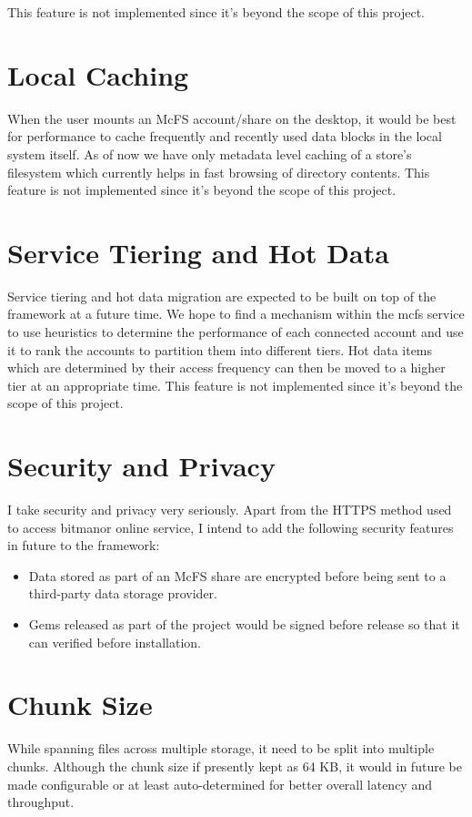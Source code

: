 This feature is not implemented since it's beyond the scope of this project.

\section{Local Caching}
When the user mounts an McFS account/share on the desktop, it would be best for performance to cache frequently and recently used data blocks in the local system itself. As of now we have only metadata level caching of a store's filesystem which currently helps in fast browsing of directory contents. This feature is not implemented since it's beyond the scope of this project.

\section{Service Tiering and Hot Data}
Service tiering and hot data migration are expected to be built on top of the framework at a future time. We hope to find a mechanism within the mcfs service to use heuristics to determine the performance of each connected account and use it to rank the accounts to partition them into different tiers. Hot data items which are determined by their access frequency can then be moved to a higher tier at an appropriate time. This feature is not implemented since it's beyond the scope of this project.
 
\section{Security and Privacy}
I take security and privacy very seriously. Apart from the HTTPS method used to access bitmanor online service, I intend to add the following security features in future to the framework:

\begin{itemize}
	\item Data stored as part of an McFS share are encrypted before being sent to a third-party data storage provider.
	\item Gems released as part of the project would be signed before release so that it can verified before installation.
\end{itemize}

\section{Chunk Size}
While spanning files across multiple storage, it need to be split into multiple chunks. Although the chunk size if presently kept as 64 KB, it would in future be made configurable or at least auto-determined for better overall latency and throughput.

